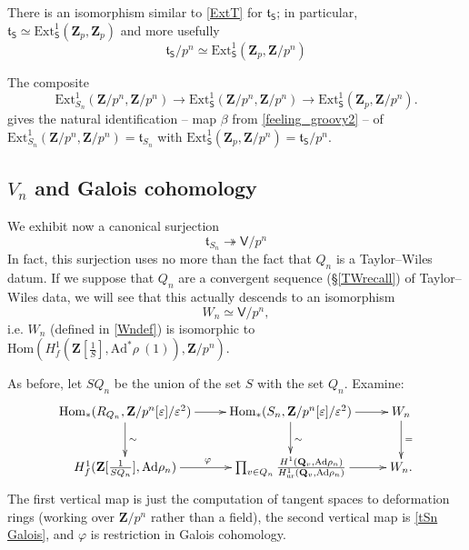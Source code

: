 \documentclass[10pt]{amsart}
\newcommand{\Z}{\mathbf{Z}}
\newcommand{\Ext}{\mathrm{Ext}}
\newcommand{\Ad}{\mathrm{Ad}}
\newcommand{\Hom}{\mathrm{Hom}}
\newcommand{\Vinf}{\mathsf{V}}
\newcommand{\Sinf}{\mathsf{S}}
\newcommand{\Q}{\mathbf{Q}}
\newcommand{\ramprimes}{S}
\theoremstyle{remark}
\begin{document}
  


  There is an isomorphism similar to \eqref{ExtT} for
 $\mathfrak{t}_{\Sinf}$; in particular,
 $ \mathfrak{t}_{\Sinf} \simeq \Ext^1_{\Sinf}(\Z_p, \Z_p)$
 and more usefully
$$ \mathfrak{t}_{\Sinf}/p^n \simeq \Ext^1_{\Sinf}(\Z_p, \Z/p^n)$$

 
The composite
 \begin{equation} \label{compositemap} \Ext^1_{S_n}(\Z/p^n, \Z/p^n)  {\longrightarrow} \Ext^1_{\Sinf}(\Z/p^n, \Z/p^n) \rightarrow \Ext^1_{\Sinf}(\Z_p, \Z/p^n).\end{equation}
%
%
%
%
%
%
%
%
%
%
%
%
%
gives the natural identification  -- map $\beta$ from \eqref{feeling_groovy2}
 -- of $\Ext^1_{S_n}(\Z/p^n, \Z/p^n) = \mathfrak{t}_{S_n}$
 with $ \Ext^1_{\Sinf}(\Z_p, \Z/p^n) = \mathfrak{t}_{\Sinf}/p^n$.
 
 
 




\subsection{$V_n$ and Galois cohomology} \label{Vnhstar}

\label{DDR REF2}

  We  exhibit now a canonical surjection 
\begin{equation} \label{tsnvsurj}  \mathfrak{t}_{S_n} \twoheadrightarrow \Vinf/p^n\end{equation}
In fact, this surjection uses no more than the fact that $Q_n$ is a Taylor--Wiles datum. If we suppose
that $Q_n$ are a convergent sequence (\S \ref{TWrecall}) of Taylor--Wiles data,   we will see that this actually descends to an isomorphism
\begin{equation} \label{brrr} W_n  \simeq \Vinf/p^n,\end{equation}
    i.e. $W_n$ (defined in \eqref{Wndef})  is isomorphic to $ \Hom( H^1_f(\Z[\frac{1}{S}], \Ad^* \rho \ (1)  ), \Z/p^n)$.     
     
  
 
  As before, let $SQ_n$ be the union of the set $\ramprimes$ with the set $Q_n$.   Examine: 
  \begin{equation}
 \xymatrix{
 \Hom_{*}(R_{Q_n}, \Z/p^n[\varepsilon]/\varepsilon^2) \ar[r] \ar[d]^{\sim} & \Hom_{*}(S_n, \Z/p^n[\varepsilon]/\varepsilon^2) \ar[r]\ar[d]^{\sim} &  W_n \ar[d]^{=}\\ 
  H^1_f(\Z[\frac{1}{SQ_n}], \Ad \rho_n)  \ar[r]^{\varphi} &     \prod_{v \in Q_n} \frac{H^1(\Q_v, \Ad \rho_n)}{H^1_{\mathrm{ur}}(\Q_v, \Ad \rho_n)}   \ar[r] &  W_n.%
 }
 \end{equation} 
 The first  vertical map is just the computation of tangent spaces  to deformation rings (working over $\Z/p^n$ rather than a field),  the second vertical map 
 is \eqref{tSn Galois}, and $\varphi$ is restriction in Galois cohomology.
 
\end{document}
